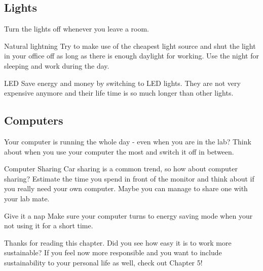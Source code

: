 \subsection{Lights}
	Turn the lights off whenever you leave a room. 
	
\begin{suggest}{Natural lightning}
	Try to make use of the cheapest light source and shut the light in your office off as long as there is enough daylight for working. Use the night for sleeping and work during the day. 
\end{suggest} 

\begin{suggest}{LED}
		 Save energy and money by switching to LED lights. They are not very expensive anymore and their life time is so much longer than other lights.
\end{suggest}

\subsection{Computers}
	Your computer is running the whole day - even when you are in the lab? 
	Think about when you use your computer the most and switch it off in between.

\begin{suggest}{Computer Sharing}
	Car sharing is a common trend, so how about computer sharing? 
	Estimate the time you spend in front of the monitor and think about if you really need your own computer. Maybe you can manage to share one with your lab mate. 
\end{suggest}

\begin{suggest}{Give it a nap}
	Make sure your computer turns to energy saving mode when your not using it for a short time. 
\end{suggest}


Thanks for reading this chapter. Did you see how easy it is to work more sustainable? 
If you feel now more responsible and you want to include sustainability to your personal life as well, check out Chapter 5!  

